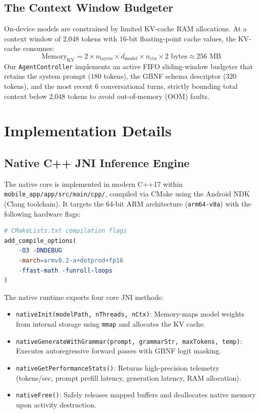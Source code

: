 \documentclass[12pt,a4paper,oneside]{report}
\begin{document}
\section{The Context Window Budgeter}
On-device models are constrained by limited KV-cache RAM allocations. At a context window of 2,048 tokens with 16-bit floating-point cache values, the KV-cache consumes:
\begin{equation}
    \text{Memory}_{\text{KV}} = 2 \times n_{\text{layers}} \times d_{\text{model}} \times n_{\text{ctx}} \times 2 \text{ bytes} \approx 256\text{ MB}
\end{equation}
Our \texttt{AgentController} implements an active FIFO sliding-window budgeter that retains the system prompt ($180$ tokens), the GBNF schema descriptor ($320$ tokens), and the most recent 6 conversational turns, strictly bounding total context below 2,048 tokens to avoid out-of-memory (OOM) faults.

\newpage
\chapter{Implementation Details}

\section{Native C++ JNI Inference Engine}
The native core is implemented in modern C++17 within \texttt{mobile\_app/app/src/main/cpp/}, compiled via CMake using the Android NDK (Clang toolchain). It targets the 64-bit ARM architecture (\texttt{arm64-v8a}) with the following hardware flags:
\begin{lstlisting}[language=make]
# CMakeLists.txt compilation flags
add_compile_options(
    -O3 -DNDEBUG
    -march=armv8.2-a+dotprod+fp16
    -ffast-math -funroll-loops
)
\end{lstlisting}
The native runtime exports four core JNI methods:
\begin{itemize}
    \item \texttt{nativeInit(modelPath, nThreads, nCtx)}: Memory-maps model weights from internal storage using \texttt{mmap} and allocates the KV cache.
    \item \texttt{nativeGenerateWithGrammar(prompt, grammarStr, maxTokens, temp)}: Executes autoregressive forward passes with GBNF logit masking.
    \item \texttt{nativeGetPerformanceStats()}: Returns high-precision telemetry (tokens/sec, prompt prefill latency, generation latency, RAM allocation).
    \item \texttt{nativeFree()}: Safely releases mapped buffers and deallocates native memory upon activity destruction.
\end{itemize}
\end{document}
